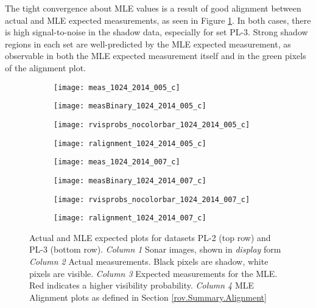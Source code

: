 The tight convergence about MLE values is a result of good alignment between actual and MLE expected measurements, as seen in Figure \ref{fig:PLPlots1}.
In both cases, there is high signal-to-noise in the shadow data, especially for set PL-3.
Strong shadow regions in each set are well-predicted by the MLE expected measurement, as observable in both the MLE expected measurement itself and in the green pixels of the alignment plot.

\begin{figure} [h!]
	\centering
	\begin{subfigure}[b]{0.24\textwidth}
                \texttt{[image: meas\_1024\_2014\_005\_c]}
                \caption{}
	\end{subfigure}
  	\centering
	\begin{subfigure}[b]{0.24\textwidth}
                \texttt{[image: measBinary\_1024\_2014\_005\_c]}
		\caption{}
  	\end{subfigure}
  	\centering
	\begin{subfigure}[b]{0.24\textwidth}
                \texttt{[image: rvisprobs\_nocolorbar\_1024\_2014\_005\_c]}
		\caption{}
  	\end{subfigure}
  	\centering
	\begin{subfigure}[b]{0.24\textwidth}
                \texttt{[image: ralignment\_1024\_2014\_005\_c]}
		\caption{}
  	\end{subfigure}
  	
  	\begin{subfigure}[b]{0.24\textwidth}
                \texttt{[image: meas\_1024\_2014\_007\_c]}
                \caption{}
	\end{subfigure}
  	\centering
	\begin{subfigure}[b]{0.24\textwidth}
                \texttt{[image: measBinary\_1024\_2014\_007\_c]}
		\caption{}
  	\end{subfigure}
  	\centering
	\begin{subfigure}[b]{0.24\textwidth}
                \texttt{[image: rvisprobs\_nocolorbar\_1024\_2014\_007\_c]}
		\caption{}
  	\end{subfigure}
  	\centering
	\begin{subfigure}[b]{0.24\textwidth}
                \texttt{[image: ralignment\_1024\_2014\_007\_c]}
		\caption{}
  	\end{subfigure}
  	
  	\caption{Actual and MLE expected plots for datasets PL-2 (top row) and PL-3 (bottom row). \emph{Column 1} Sonar images, shown in \emph{display} form \emph{Column 2} Actual measurements. Black pixels are shadow, white pixels are visible. \emph{Column 3} Expected measurements for the MLE. Red indicates a higher visibility probability. \emph{Column 4} MLE Alignment plots as defined in Section \ref{rov.Summary.Alignment}}
	\label{fig:PLPlots1}
\end{figure}

